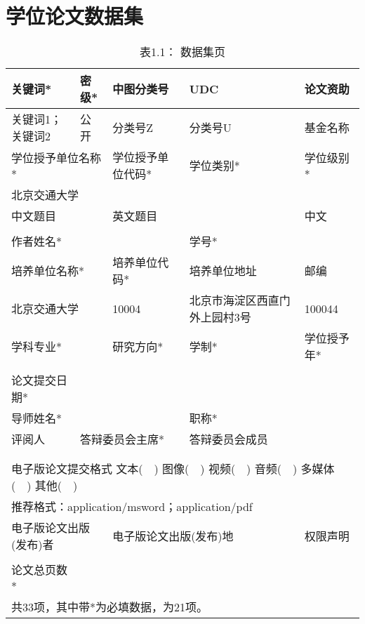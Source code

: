 \chapter*{学位论文数据集}
\begin{table}[H]
\caption*{表1.1： 数据集页}
\renewcommand\arraystretch{0.8} %
\centering
	\begin{tabular}{|p{2.9cm}|p{2.1cm}|p{2.9cm}|p{3.4cm}|p{2.5cm}|}
		\hline	关键词* &密级* & 中图分类号 &	UDC& 论文资助\\
		\hline 关键词1；关键词2&公开&分类号Z&分类号U&基金名称\\
		\hline	\multicolumn{2}{|l|}{学位授予单位名称*}&	学位授予单位代码*&	学位类别* & 学位级别*\\
		\hline	\multicolumn{2}{|l|}{北京交通大学}&	& & \\
		\hline	\multicolumn{2}{|p{5.0cm}|}{中文题目} &	\multicolumn{2}{p{6.3cm}|}{英文题目}&中文\\
		\hline	\multicolumn{2}{|l|}{} &	\multicolumn{2}{l|}{}&\\
		\hline	作者姓名*&	\multicolumn{2}{l|}{}&学号* &\\
		\hline	\multicolumn{2}{|l|}{培养单位名称*}&培养单位代码*&培养单位地址&邮编\\
		\hline	\multicolumn{2}{|l|}{北京交通大学}&10004&	北京市海淀区西直门外上园村3号& 100044\\
        \hline	\multicolumn{2}{|l|}{学科专业*}&研究方向*&学制*&学位授予年*\\
        \hline	\multicolumn{2}{|l|}{}&&&\\
        \hline	论文提交日期*&\multicolumn{4}{l|}{}\\
		\hline	导师姓名*&\multicolumn{2}{l|}{}&职称*&\\
        \hline	评阅人&\multicolumn{2}{l|}{答辩委员会主席*}&\multicolumn{2}{l|}{答辩委员会成员}\\
        \hline	&\multicolumn{2}{l|}{}&\multicolumn{2}{l|}{}\\
               &\multicolumn{2}{l|}{}&\multicolumn{2}{l|}{}\\
        \hline \multicolumn{5}{|l|}{电子版论文提交格式  文本(~~)  图像(~~) 视频(~~) 音频(~~) 多媒体(~~) 其他(~~)}\\
        \multicolumn{5}{|l|}{推荐格式：application/msword；application/pdf}\\
        \hline	\multicolumn{2}{|l|}{电子版论文出版(发布)者}&\multicolumn{2}{l|}{电子版论文出版(发布)地}&权限声明\\
		\hline  \multicolumn{2}{|l|}{}&\multicolumn{2}{l|}{}&\\
		\hline  论文总页数*&\multicolumn{4}{l|}{}\\
		\hline  \multicolumn{5}{|l|}{共33项，其中带*为必填数据，为21项。}\\
		\hline
\end{tabular}
\end{table}

